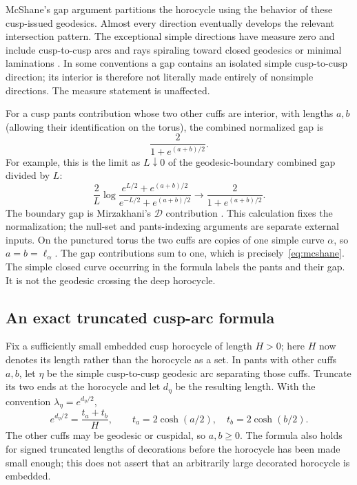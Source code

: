 McShane's gap argument partitions the horocycle using the behavior of
these cusp-issued geodesics. Almost every direction eventually develops
the relevant intersection pattern. The exceptional simple directions
have measure zero and include cusp-to-cusp arcs and rays spiraling toward
closed geodesics or minimal laminations
\cite{McShane}\cite[Theorem 3, p.~4, and the paragraph after
Corollary 5, p.~5]{McShanePants}.
In some conventions a gap contains an isolated simple cusp-to-cusp
direction; its interior is therefore not literally made entirely of
nonsimple directions. The measure statement is unaffected.

For a cusp pants contribution whose two other cuffs are interior, with
lengths $a,b$ (allowing their identification on the torus), the combined
normalized gap is
\begin{equation}
 \frac{2}{1+e^{(a+b)/2}}.
 \label{eq:cuspgap}
\end{equation}
For example, this is the limit as $L\downarrow0$ of the geodesic-boundary
combined gap divided by $L$:
\[
 \frac{2}{L}\log
 \frac{e^{L/2}+e^{(a+b)/2}}{e^{-L/2}+e^{(a+b)/2}}
 \longrightarrow \frac{2}{1+e^{(a+b)/2}}.
\]
The boundary gap is Mirzakhani's $\mathcal D$ contribution
\cite[Lemma 3.1, equation (3.1), and Theorem 4.2]{MirzVolumes}. This calculation fixes the
normalization; the null-set and pants-indexing arguments are separate
external inputs.
On the punctured torus the two cuffs are copies of one simple curve
$\alpha$, so $a=b=\ell_\alpha$. The gap contributions sum to one,
which is precisely~\eqref{eq:mcshane}. The simple closed curve occurring
in the formula labels the pants and their gap. It is not the geodesic
crossing the deep horocycle.

\subsection{An exact truncated cusp-arc formula}

Fix a sufficiently small embedded cusp horocycle of length $H>0$; here $H$ now
denotes its length rather than the horocycle as a set. In pants with other
cuffs $a,b$, let $\eta$ be the simple cusp-to-cusp geodesic arc separating
those cuffs. Truncate its two ends at the horocycle and let $d_\eta$ be
the resulting length. With the convention $\lambda_\eta=e^{d_\eta/2}$,
\begin{equation}
 \boxed{e^{d_\eta/2}=\frac{t_a+t_b}{H},
        \qquad t_a=2\cosh(a/2),\quad t_b=2\cosh(b/2).}
 \label{eq:cusplambda}
\end{equation}
The other cuffs may be geodesic or cuspidal, so $a,b\geq0$.
The formula also holds for signed truncated lengths of decorations before
the horocycle has been made small enough; this does not assert that an
arbitrarily large decorated horocycle is embedded.

